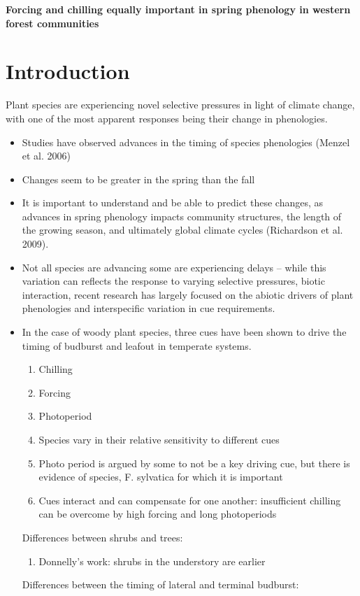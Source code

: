\documentclass[11pt,letter]{article}
\begin{document}
%
\renewcommand{\refname}{\CHead{}}

{\bf Forcing and chilling equally important in spring phenology in western forest communities}\\ 

\section{Introduction} 

Plant species are experiencing novel selective pressures in light of climate change, with one of the most apparent responses being their change in phenologies. 
\begin{itemize}
\item Studies have observed advances in the timing of species phenologies (Menzel et al. 2006) 
\item Changes seem to be greater in the spring than the fall
\item It is important to understand and be able to predict these changes, as advances in spring phenology impacts community structures, the length of the growing season, and ultimately global climate cycles (Richardson et al. 2009).

\item Not all species are advancing some are experiencing delays -- while this variation can reflects the response to varying selective pressures, biotic interaction, recent research has largely focused on the abiotic drivers of plant phenologies and interspecific variation in cue requirements. 
\item In the case of woody plant species, three cues have been shown to drive the timing of budburst and leafout in temperate systems. 
	\begin{enumerate}
	\item Chilling
	\item Forcing
	\item Photoperiod
	\item Species vary in their relative sensitivity to different cues
	\item Photo period is argued by some to not be a key driving cue, but there is evidence of species, F. sylvatica for which it is important
	\item Cues interact and can compensate for one another: insufficient chilling can be overcome by high forcing and long photoperiods
	\end{enumerate}

Differences between shrubs and trees:
\begin{enumerate}
\item Donnelly's work: shrubs in the understory are earlier
\end{enumerate}

Differences between the timing of lateral and terminal budburst:
\end{itemize}
\end{document}
